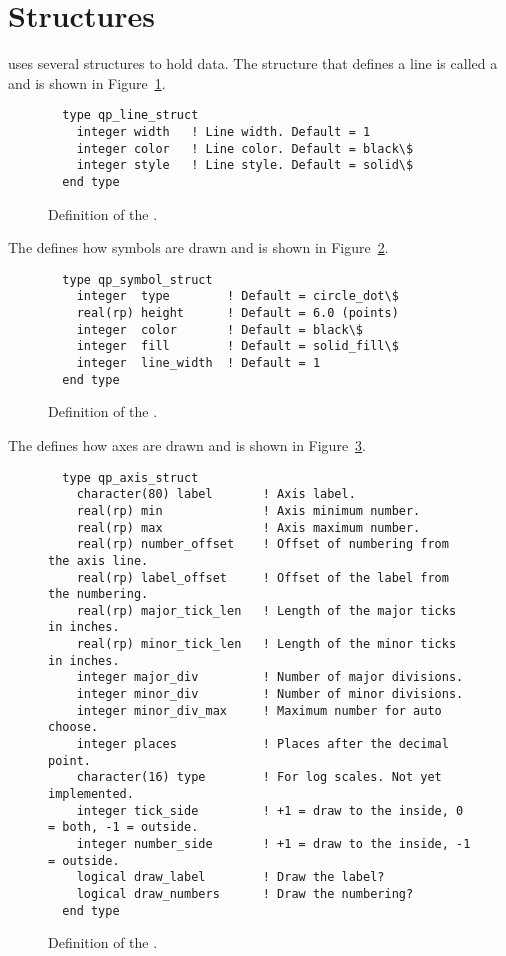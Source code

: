 \section{Structures}
\label{s:qp_structs}

\quickplot uses several structures to hold data. The structure that
defines a line is called a  and is shown in
Figure~\ref{f:qp_line_struct}. 
\begin{figure}[htb]
\centering
\begin{verbatim}
  type qp_line_struct
    integer width   ! Line width. Default = 1
    integer color   ! Line color. Default = black\$
    integer style   ! Line style. Default = solid\$
  end type
\end{verbatim}
\caption{Definition of the .}
\label{f:qp_line_struct}
\end{figure}

The  defines how symbols are drawn and is shown
in Figure~\ref{f:qp_sym_struct}.
\begin{figure}[htb]
\centering
\begin{verbatim}
  type qp_symbol_struct
    integer  type        ! Default = circle_dot\$
    real(rp) height      ! Default = 6.0 (points)
    integer  color       ! Default = black\$
    integer  fill        ! Default = solid_fill\$
    integer  line_width  ! Default = 1
  end type
\end{verbatim}
\caption{Definition of the .}
\label{f:qp_sym_struct}
\end{figure}

The  defines how axes are drawn and is shown
in Figure~\ref{f:qp_axis_struct}.
\begin{figure}[htb]
\centering
\begin{verbatim}
  type qp_axis_struct
    character(80) label       ! Axis label.
    real(rp) min              ! Axis minimum number.
    real(rp) max              ! Axis maximum number.
    real(rp) number_offset    ! Offset of numbering from the axis line.
    real(rp) label_offset     ! Offset of the label from the numbering.
    real(rp) major_tick_len   ! Length of the major ticks in inches.
    real(rp) minor_tick_len   ! Length of the minor ticks in inches.
    integer major_div         ! Number of major divisions.
    integer minor_div         ! Number of minor divisions.
    integer minor_div_max     ! Maximum number for auto choose.
    integer places            ! Places after the decimal point.
    character(16) type        ! For log scales. Not yet implemented.
    integer tick_side         ! +1 = draw to the inside, 0 = both, -1 = outside.
    integer number_side       ! +1 = draw to the inside, -1 = outside.
    logical draw_label        ! Draw the label?
    logical draw_numbers      ! Draw the numbering?
  end type
\end{verbatim}
\caption{Definition of the .}
\label{f:qp_axis_struct}
\end{figure}


